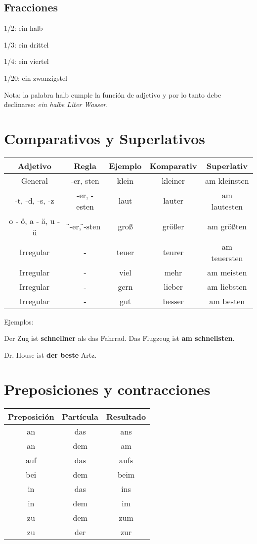 \subsection{Fracciones}
\begin{multicols}{2}
\begin{myitemize}
\item 1/2: ein halb
\item 1/3: ein drittel
\item 1/4: ein viertel
\item 1/20: ein zwanzigstel
\end{myitemize}
\end{multicols}
Nota: la palabra halb cumple la función de adjetivo y por lo tanto debe declinarse: \textit{ein halbe Liter Wasser}.

\section{Comparativos y Superlativos}
\begin{tabular}{| c | c | c | c | c |}
\hline
\textbf{Adjetivo} & \textbf{Regla} & \textbf{Ejemplo} & \textbf{Komparativ} & \textbf{Superlativ} \\
\hline
General & -er, sten & klein & kleiner & am kleinsten \\
-t, -d, -s, -z & -er, -esten & laut & lauter & am lautesten \\
o - ö, a - ä, u - ü & \"{ }-er, \"{ }-sten & groß & größer & am größten \\
Irregular & - & teuer & teurer & am teuersten \\
Irregular & - & viel & mehr & am meisten \\
Irregular & - & gern & lieber & am liebsten \\
Irregular & - & gut & besser & am besten \\
\hline
\end{tabular}

Ejemplos: 
\begin{myitemize}
\item Der Zug ist \textbf{schnellner} als das Fahrrad. Das Flugzeug ist \textbf{am schnellsten}.
\item Dr. House ist \textbf{der beste} Artz.
\end{myitemize}

\section{Preposiciones y contracciones}
\begin{tabular}{| c | c | c |}
\hline
\textbf{Preposición} & \textbf{Partícula} & \textbf{Resultado} \\
\hline
an & das & ans \\
an & dem & am \\
auf & das & aufs \\
bei & dem & beim \\
in & das & ins \\
in & dem & im \\
zu & dem & zum \\
zu & der & zur \\
\hline
\end{tabular}

